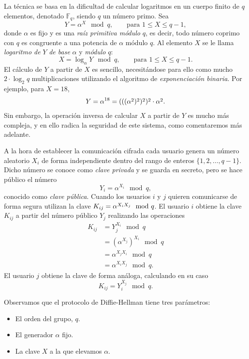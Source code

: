 \documentclass[
  a4paper,
  12pt,
  spanish,
]{scrartcl}
\begin{document}
La técnica se basa en la dificultad de calcular logaritmos en un cuerpo finito de \(q\) elementos, denotado \(\mathbb F_q\), siendo \(q\) un número primo. 
Sea \[Y = \alpha^X \mod q, \qquad \text{para } 1 \leq X \leq q - 1,\] donde \(\alpha\) es fijo y es una \textit{raíz primitiva módulo} \(q\), es decir, todo número coprimo con \(q\) es congruente a una potencia de \(\alpha\) módulo \(q\). 
Al elemento \(X\) se le llama \textit{logaritmo de} \(Y\) \textit{de base} \(\alpha\) y \textit{módulo} \(q\): \[X = \log_{\alpha} Y \mod q, \qquad \text{para } 1 \leq X \leq q - 1.\]
El cálculo de \(Y\) a partir de \(X\) es sencillo, necesitándose para ello como mucho \(2 \cdot \log_2 q\) multiplicaciones utilizando el algoritmo de \textit{exponenciación binaria}. Por ejemplo, para \(X = 18\), \[Y = \alpha^{18} = \cramped{(((\alpha^2)^2)^2)^2} \cdot \cramped{\alpha^2}.\]
Sin embargo, la operación inversa de calcular \(X\) a partir de \(Y\) es mucho más compleja, y en ello radica la seguridad de este sistema, como comentaremos más adelante.

A la hora de establecer la comunicación cifrada cada usuario genera un número aleatorio \(X_i\) de forma independiente dentro del rango de enteros \(\{1, 2, \dots, q - 1\}\). 
Dicho número se conoce como \textit{clave privada} y se guarda en secreto, pero se hace público el número \[Y_i = \alpha^{X_i} \mod q,\] conocido como \textit{clave pública}. 
Cuando los usuarios \(i\) y \(j\) quieren comunicarse de forma segura utilizan la clave \(K_{ij} = \cramped{\alpha^{X_iX_j}} \mod q\). 
El usuario \(i\) obtiene la clave \(K_{ij}\) a partir del número público \(Y_j\) realizando las operaciones \begin{align*}
  K_{ij} &= Y_j^{X_i} \mod q \\
    &= (\alpha^{X_j})^{X_i} \mod q \\
    &= \alpha^{X_jX_i} \mod q \\
    &= \alpha^{X_iX_j} \mod q.
\end{align*}
El usuario \(j\) obtiene la clave de forma análoga, calculando en su caso \[K_{ij} = Y_i^{X_j} \mod q.\]

Observamos que el protocolo de Diffie-Hellman tiene tres parámetros: \begin{itemize}
  \item El orden del grupo, \(q\).
  \item El generador \(\alpha\) fijo.
  \item La clave \(X\) a la que elevamos \(\alpha\).
\end{itemize}
\end{document}
